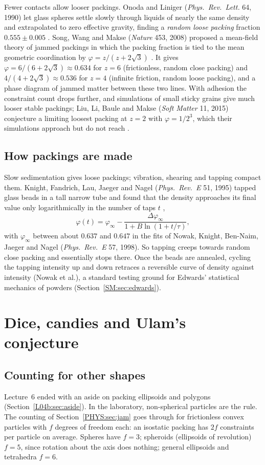 Fewer contacts allow looser packings. Onoda and Liniger (\emph{Phys.\ Rev.\ Lett.} 64, 1990) let glass
spheres settle slowly through liquids of nearly the same density and extrapolated to zero effective
gravity, finding a \emph{random loose packing} fraction $0.555\pm0.005$ . Song, Wang and Makse
(\emph{Nature} 453, 2008) proposed a mean-field theory of jammed packings in which the packing fraction is
tied to the mean geometric coordination by $\varphi=z/(z+2\sqrt3)$ . It gives
$\varphi=6/(6+2\sqrt3)\approx0.634$ for $z=6$ (frictionless, random close packing) and
$4/(4+2\sqrt3)\approx0.536$ for $z=4$ (infinite friction, random loose packing), and a phase diagram of
jammed matter between these two lines. With adhesion the constraint count drops further, and simulations of
small sticky grains give much looser stable packings; Liu, Li, Baule and Makse (\emph{Soft Matter} 11, 2015)
conjecture a limiting loosest packing at $z=2$ with $\varphi=1/2^3$, which their simulations approach but
do not reach .

\subsection*{How packings are made}
Slow sedimentation gives loose packings; vibration, shearing and tapping compact them. Knight, Fandrich, Lau, Jaeger and Nagel (\emph{Phys.\ Rev.~E}
51, 1995) tapped glass beads in a tall narrow tube and found that the density approaches its final value
only logarithmically in the number of taps $t$ ,
\[
  \varphi(t)=\varphi_\infty-\frac{\Delta\varphi_\infty}{1+B\ln(1+t/\tau)},
\]
with $\varphi_\infty$ between about $0.637$ and $0.647$ in the fits of Nowak, Knight, Ben-Naim, Jaeger and Nagel
(\emph{Phys.\ Rev.~E} 57, 1998). So tapping creeps towards random close packing and essentially stops there. Once the beads are annealed,
cycling the tapping intensity up and down retraces a reversible curve of density against intensity
(Nowak et al.), a standard testing ground for Edwards' statistical mechanics of powders
(Section~\ref{SM:sec:edwards}).

\section{Dice, candies and Ulam's conjecture}
\label{PHYS:sec:shapes}

\subsection*{Counting for other shapes}
Lecture~6 ended with an aside on packing ellipsoids and polygons (Section~\ref{L04b:sec:aside}). In the
laboratory, non-spherical particles are the rule. The counting of Section~\ref{PHYS:sec:jam} goes through
for frictionless convex particles with $f$ degrees of freedom each: an isostatic packing has $2f$
constraints per particle on average. Spheres have $f=3$; spheroids (ellipsoids of revolution) $f=5$, since
rotation about the axis does nothing; general ellipsoids and tetrahedra $f=6$.

